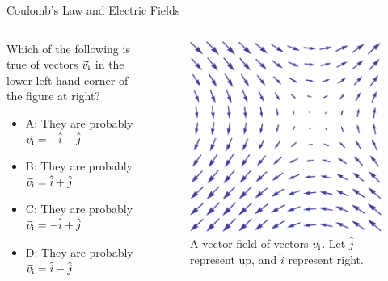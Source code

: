 \documentclass{beamer}
\begin{document}
\begin{frame}{Coulomb’s Law and Electric Fields}
\small
\begin{columns}[T]
\begin{column}{0.5\textwidth}
Which of the following is true of vectors $\vec{v}_{\rm i}$ in the lower left-hand corner of the figure at right?
\begin{itemize}
\item A: They are probably $\vec{v}_{\rm i} = -\hat{i}-\hat{j}$
\item B: They are probably $\vec{v}_{\rm i} = \hat{i}+\hat{j}$
\item C: They are probably $\vec{v}_{\rm i} = -\hat{i}+\hat{j}$
\item D: They are probably $\vec{v}_{\rm i} = \hat{i}-\hat{j}$
\end{itemize}
\end{column}
\begin{column}{0.5\textwidth}
\begin{figure}
\includegraphics[width=\textwidth]{figures/vectorField.png}
\caption{\label{fig:field} A vector field of vectors $\vec{v}_{\rm i}$.  Let $\hat{j}$ represent up, and $\hat{i}$ represent right.}
\end{figure}
\end{column}
\end{columns}
\end{frame}
\end{document}
